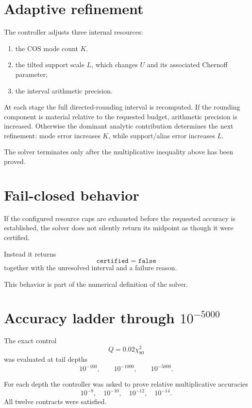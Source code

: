 \section{Adaptive refinement}

The controller adjusts three internal resources:

\begin{enumerate}
\item the COS mode count \(K\).
\item the tilted support scale \(L\), which changes \(U\) and its associated
Chernoff parameter;
\item the interval arithmetic precision.
\end{enumerate}

At each stage the full directed-rounding interval is recomputed.  If the
rounding component is material relative to the requested budget, arithmetic
precision is increased.  Otherwise the dominant analytic contribution
determines the next refinement: mode error increases \(K\), while
support/alias error increases \(L\).

The solver terminates only after the multiplicative inequality above has been
proved.

\section{Fail-closed behavior}

If the configured resource caps are exhausted before the requested accuracy
is established, the solver does not silently return its midpoint as though it
were certified.

Instead it returns
\[
\boxed{\texttt{certified = false}}
\]
together with the unresolved interval and a failure reason.

This behavior is part of the numerical definition of the solver.

\section{Accuracy ladder through \texorpdfstring{\(10^{-5000}\)}{1e-5000}}

The exact control
\[
Q=0.02\chi^2_{80}
\]
was evaluated at tail depths
\[
10^{-100},
\qquad
10^{-1000},
\qquad
10^{-5000}.
\]

For each depth the controller was asked to prove relative multiplicative
accuracies
\[
10^{-8},
\quad
10^{-10},
\quad
10^{-12},
\quad
10^{-14}.
\]
All twelve contracts were satisfied.

